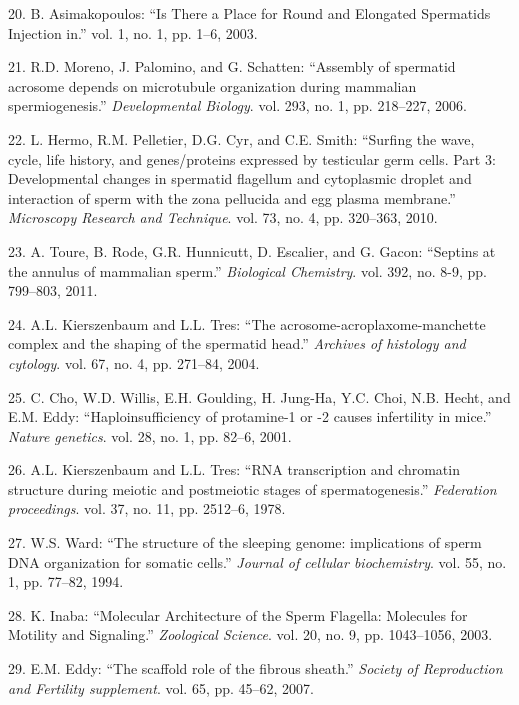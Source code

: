 \documentclass[12pt,twoside]{ugathesis}
\theoremstyle{definition}
\theoremstyle{definition}
\theoremstyle{remark}
\begin{document}
\hypertarget{ref-Asimakopoulos2003}{}
20. B. Asimakopoulos: ``Is There a Place for Round and Elongated
Spermatids Injection in.'' vol. 1, no. 1, pp. 1--6, 2003.

\hypertarget{ref-Moreno2006}{}
21. R.D. Moreno, J. Palomino, and G. Schatten: ``Assembly of spermatid
acrosome depends on microtubule organization during mammalian
spermiogenesis.'' \emph{Developmental Biology}. vol. 293, no. 1, pp.
218--227, 2006.

\hypertarget{ref-Hermo2010}{}
22. L. Hermo, R.M. Pelletier, D.G. Cyr, and C.E. Smith: ``Surfing the
wave, cycle, life history, and genes/proteins expressed by testicular
germ cells. Part 3: Developmental changes in spermatid flagellum and
cytoplasmic droplet and interaction of sperm with the zona pellucida and
egg plasma membrane.'' \emph{Microscopy Research and Technique}. vol.
73, no. 4, pp. 320--363, 2010.

\hypertarget{ref-Toure2011}{}
23. A. Toure, B. Rode, G.R. Hunnicutt, D. Escalier, and G. Gacon:
``Septins at the annulus of mammalian sperm.'' \emph{Biological
Chemistry}. vol. 392, no. 8-9, pp. 799--803, 2011.

\hypertarget{ref-Kierszenbaum2004}{}
24. A.L. Kierszenbaum and L.L. Tres: ``The
acrosome-acroplaxome-manchette complex and the shaping of the spermatid
head.'' \emph{Archives of histology and cytology}. vol. 67, no. 4, pp.
271--84, 2004.

\hypertarget{ref-Cho2001}{}
25. C. Cho, W.D. Willis, E.H. Goulding, H. Jung-Ha, Y.C. Choi, N.B.
Hecht, and E.M. Eddy: ``Haploinsufficiency of protamine-1 or -2 causes
infertility in mice.'' \emph{Nature genetics}. vol. 28, no. 1, pp.
82--6, 2001.

\hypertarget{ref-Kierszenbaum1978}{}
26. A.L. Kierszenbaum and L.L. Tres: ``RNA transcription and chromatin
structure during meiotic and postmeiotic stages of spermatogenesis.''
\emph{Federation proceedings}. vol. 37, no. 11, pp. 2512--6, 1978.

\hypertarget{ref-Ward1994}{}
27. W.S. Ward: ``The structure of the sleeping genome: implications of
sperm DNA organization for somatic cells.'' \emph{Journal of cellular
biochemistry}. vol. 55, no. 1, pp. 77--82, 1994.

\hypertarget{ref-Inaba2003}{}
28. K. Inaba: ``Molecular Architecture of the Sperm Flagella: Molecules
for Motility and Signaling.'' \emph{Zoological Science}. vol. 20, no. 9,
pp. 1043--1056, 2003.

\hypertarget{ref-Eddy2007}{}
29. E.M. Eddy: ``The scaffold role of the fibrous sheath.''
\emph{Society of Reproduction and Fertility supplement}. vol. 65, pp.
45--62, 2007.
\end{document}
